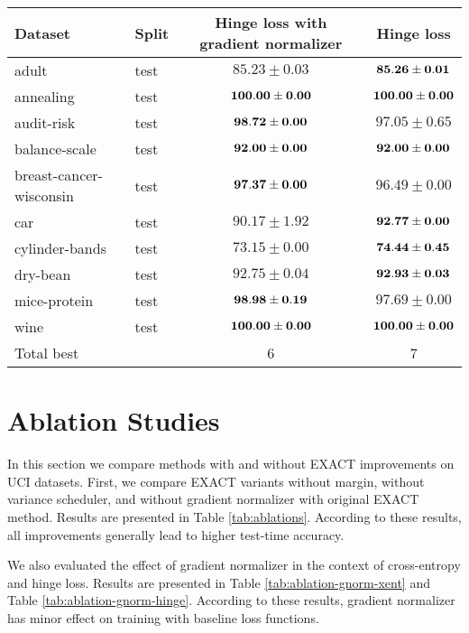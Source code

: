 \documentclass[nohyperref]{article}
\theoremstyle{plain}
\theoremstyle{definition}
\theoremstyle{remark}
\begin{document}
\begin{table*}[t]
\centering
\begin{tabular}{ll|cc}
Dataset & Split & Hinge loss with gradient normalizer & Hinge loss \\
\hline
adult                    & test & $85.23 \pm 0.03$ & $\bf 85.26 \pm 0.01$ \\
annealing                & test & $\bf 100.00 \pm 0.00$ & $\bf 100.00 \pm 0.00$ \\
audit-risk               & test & $\bf 98.72 \pm 0.00$ & $97.05 \pm 0.65$ \\
balance-scale            & test & $\bf 92.00 \pm 0.00$ & $\bf 92.00 \pm 0.00$ \\
breast-cancer-wisconsin  & test & $\bf 97.37 \pm 0.00$ & $96.49 \pm 0.00$ \\
car                      & test & $90.17 \pm 1.92$ & $\bf 92.77 \pm 0.00$ \\
cylinder-bands           & test & $73.15 \pm 0.00$ & $\bf 74.44 \pm 0.45$ \\
dry-bean                 & test & $92.75 \pm 0.04$ & $\bf 92.93 \pm 0.03$ \\
mice-protein             & test & $\bf 98.98 \pm 0.19$ & $97.69 \pm 0.00$ \\
wine                     & test & $\bf 100.00 \pm 0.00$ & $\bf 100.00 \pm 0.00$ \\
\hline
Total best & & 6 & 7 \\


\end{tabular}

\caption{Comparison of hinge loss with and without gradient normalizer on tabular datasets.}
\label{tab:ablation-gnorm-hinge}
\end{table*}

\section{Ablation Studies}
In this section we compare methods with and without \mbox{EXACT} improvements on UCI datasets. First, we compare EXACT variants without margin, without variance scheduler, and without gradient normalizer with original EXACT method. Results are presented in Table \ref{tab:ablations}. According to these results, all improvements generally lead to higher test-time accuracy.

We also evaluated the effect of gradient normalizer in the context of cross-entropy and hinge loss. Results are presented in Table \ref{tab:ablation-gnorm-xent} and Table \ref{tab:ablation-gnorm-hinge}. According to these results, gradient normalizer has minor effect on training with baseline loss functions.
\end{document}
